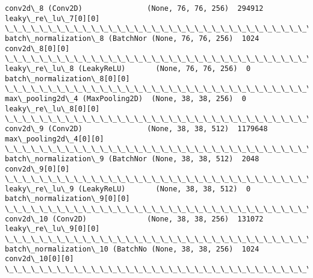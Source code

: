 \documentclass[11pt]{article}
\begin{document}
\begin{Verbatim}[commandchars=\\\{\}]
conv2d\_8 (Conv2D)               (None, 76, 76, 256)  294912      leaky\_re\_lu\_7[0][0]              
\_\_\_\_\_\_\_\_\_\_\_\_\_\_\_\_\_\_\_\_\_\_\_\_\_\_\_\_\_\_\_\_\_\_\_\_\_\_\_\_\_\_\_\_\_\_\_\_\_\_\_\_\_\_\_\_\_\_\_\_\_\_\_\_\_\_\_\_\_\_\_\_\_\_\_\_\_\_\_\_\_\_\_\_\_\_\_\_\_\_\_\_\_\_\_\_\_\_
batch\_normalization\_8 (BatchNor (None, 76, 76, 256)  1024        conv2d\_8[0][0]                   
\_\_\_\_\_\_\_\_\_\_\_\_\_\_\_\_\_\_\_\_\_\_\_\_\_\_\_\_\_\_\_\_\_\_\_\_\_\_\_\_\_\_\_\_\_\_\_\_\_\_\_\_\_\_\_\_\_\_\_\_\_\_\_\_\_\_\_\_\_\_\_\_\_\_\_\_\_\_\_\_\_\_\_\_\_\_\_\_\_\_\_\_\_\_\_\_\_\_
leaky\_re\_lu\_8 (LeakyReLU)       (None, 76, 76, 256)  0           batch\_normalization\_8[0][0]      
\_\_\_\_\_\_\_\_\_\_\_\_\_\_\_\_\_\_\_\_\_\_\_\_\_\_\_\_\_\_\_\_\_\_\_\_\_\_\_\_\_\_\_\_\_\_\_\_\_\_\_\_\_\_\_\_\_\_\_\_\_\_\_\_\_\_\_\_\_\_\_\_\_\_\_\_\_\_\_\_\_\_\_\_\_\_\_\_\_\_\_\_\_\_\_\_\_\_
max\_pooling2d\_4 (MaxPooling2D)  (None, 38, 38, 256)  0           leaky\_re\_lu\_8[0][0]              
\_\_\_\_\_\_\_\_\_\_\_\_\_\_\_\_\_\_\_\_\_\_\_\_\_\_\_\_\_\_\_\_\_\_\_\_\_\_\_\_\_\_\_\_\_\_\_\_\_\_\_\_\_\_\_\_\_\_\_\_\_\_\_\_\_\_\_\_\_\_\_\_\_\_\_\_\_\_\_\_\_\_\_\_\_\_\_\_\_\_\_\_\_\_\_\_\_\_
conv2d\_9 (Conv2D)               (None, 38, 38, 512)  1179648     max\_pooling2d\_4[0][0]            
\_\_\_\_\_\_\_\_\_\_\_\_\_\_\_\_\_\_\_\_\_\_\_\_\_\_\_\_\_\_\_\_\_\_\_\_\_\_\_\_\_\_\_\_\_\_\_\_\_\_\_\_\_\_\_\_\_\_\_\_\_\_\_\_\_\_\_\_\_\_\_\_\_\_\_\_\_\_\_\_\_\_\_\_\_\_\_\_\_\_\_\_\_\_\_\_\_\_
batch\_normalization\_9 (BatchNor (None, 38, 38, 512)  2048        conv2d\_9[0][0]                   
\_\_\_\_\_\_\_\_\_\_\_\_\_\_\_\_\_\_\_\_\_\_\_\_\_\_\_\_\_\_\_\_\_\_\_\_\_\_\_\_\_\_\_\_\_\_\_\_\_\_\_\_\_\_\_\_\_\_\_\_\_\_\_\_\_\_\_\_\_\_\_\_\_\_\_\_\_\_\_\_\_\_\_\_\_\_\_\_\_\_\_\_\_\_\_\_\_\_
leaky\_re\_lu\_9 (LeakyReLU)       (None, 38, 38, 512)  0           batch\_normalization\_9[0][0]      
\_\_\_\_\_\_\_\_\_\_\_\_\_\_\_\_\_\_\_\_\_\_\_\_\_\_\_\_\_\_\_\_\_\_\_\_\_\_\_\_\_\_\_\_\_\_\_\_\_\_\_\_\_\_\_\_\_\_\_\_\_\_\_\_\_\_\_\_\_\_\_\_\_\_\_\_\_\_\_\_\_\_\_\_\_\_\_\_\_\_\_\_\_\_\_\_\_\_
conv2d\_10 (Conv2D)              (None, 38, 38, 256)  131072      leaky\_re\_lu\_9[0][0]              
\_\_\_\_\_\_\_\_\_\_\_\_\_\_\_\_\_\_\_\_\_\_\_\_\_\_\_\_\_\_\_\_\_\_\_\_\_\_\_\_\_\_\_\_\_\_\_\_\_\_\_\_\_\_\_\_\_\_\_\_\_\_\_\_\_\_\_\_\_\_\_\_\_\_\_\_\_\_\_\_\_\_\_\_\_\_\_\_\_\_\_\_\_\_\_\_\_\_
batch\_normalization\_10 (BatchNo (None, 38, 38, 256)  1024        conv2d\_10[0][0]                  
\_\_\_\_\_\_\_\_\_\_\_\_\_\_\_\_\_\_\_\_\_\_\_\_\_\_\_\_\_\_\_\_\_\_\_\_\_\_\_\_\_\_\_\_\_\_\_\_\_\_\_\_\_\_\_\_\_\_\_\_\_\_\_\_\_\_\_\_\_\_\_\_\_\_\_\_\_\_\_\_\_\_\_\_\_\_\_\_\_\_\_\_\_\_\_\_\_\_

\end{Verbatim}
\end{document}
